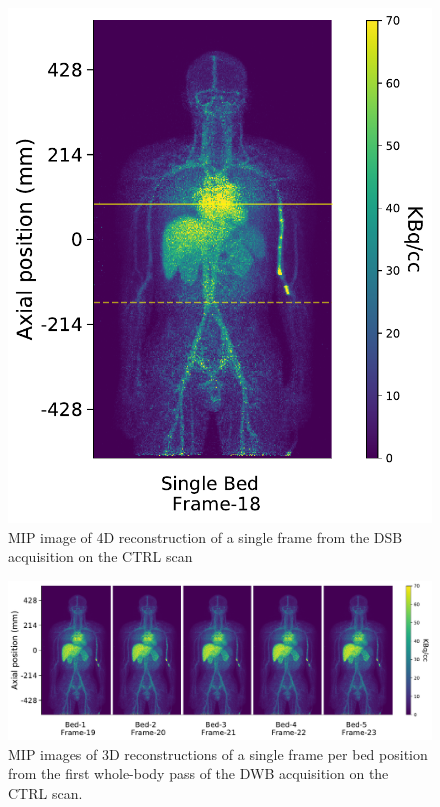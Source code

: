 \begin{figure} [h!]
\centering
\includegraphics[scale=0.52,angle=0]{3_Results/3_3_DWB_Reconstruction/figures/3_3_IsotoPK_CTRL_DSB_4D.pdf}
\caption{MIP image of 4D reconstruction of a single frame from the DSB acquisition on the CTRL scan}
\label{fig_3_3:IsotoPK_CTRL_DSB_4D}
\end{figure} 

\begin{figure} [h!]
\centering
\includegraphics[scale=0.52,angle=0]{3_Results/3_3_DWB_Reconstruction/figures/3_3_IsotoPK_CTRL_DWB_4D.pdf}
\caption{MIP images of 3D reconstructions of a single frame per bed position from the first whole-body pass of the DWB acquisition on the CTRL scan.}
\label{fig_3_3:IsotoPK_CTRL_DWB_4D}
\end{figure} 

